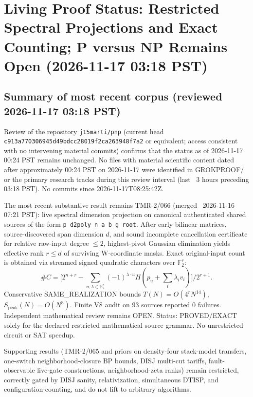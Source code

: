 \documentclass{article}
\begin{document}
\section*{Living Proof Status: Restricted Spectral Projections and Exact Counting; P versus NP Remains Open (2026-11-17 03:18 PST)}

\subsection*{Summary of most recent corpus (reviewed 2026-11-17 03:18 PST)}
Review of the repository \texttt{j15marti/pnp} (current head \texttt{c913a770306945d49bdcc28019f2ca263948f7a2} or equivalent; access consistent with no intervening material commits) confirms that the status as of 2026-11-17 00:24 PST remains unchanged. No files with material scientific content dated after approximately 00:24 PST on 2026-11-17 were identified in GROKPROOF/ or the primary research tracks during this review interval (last ~3 hours preceding 03:18 PST). No commits since 2026-11-17T08:25:42Z.

The most recent substantive result remains TMR-2/066 (merged ~2026-11-16 07:21 PST): live spectral dimension projection on canonical authenticated shared sources of the form \texttt{p d2poly n a b g root}. After early bilinear matrices, source-discovered span dimension \(d\), and sound incomplete cancellation certificate for relative raw-input degree \(\le 2\), highest-pivot Gaussian elimination yields effective rank \(r \le d\) of surviving W-coordinate masks. Exact original-input count is obtained via streamed signed quadratic characters over \(\mathbb{F}_2^r\):
\[
\#C = \bigl[2^{n+r} - \sum_{u,\lambda\in\mathbb{F}_2^r} (-1)^{\lambda\cdot u} H(p_u + \sum_i\lambda_i v_i)\bigr]/2^{r+1}.
\]
Conservative SAME\_REALIZATION bounds \(T(N)=O(4^r N^{14})\), \(S_{\mathrm{peak}}(N)=O(N^3)\). Finite V8 audit on 93 sources reported 0 failures. Independent mathematical review remains OPEN. Status: PROVED/EXACT solely for the declared restricted mathematical source grammar. No unrestricted circuit or SAT speedup.

Supporting results (TMR-2/065 and priors on density-four stack-model transfers, one-switch neighborhood-closure BP bounds, DISJ multi-cut tariffs, fault-observable live-gate constructions, neighborhood-zeta ranks) remain restricted, correctly gated by DISJ sanity, relativization, simultaneous DTISP, and configuration-counting, and do not lift to arbitrary algorithms.
\end{document}
